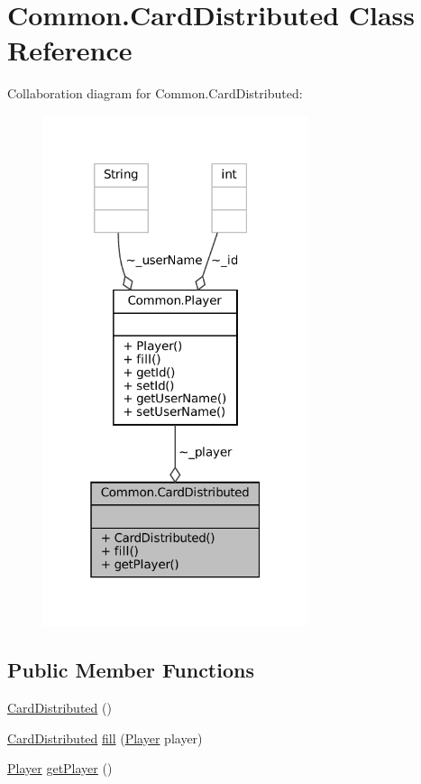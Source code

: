 \hypertarget{classCommon_1_1CardDistributed}{}\section{Common.\+Card\+Distributed Class Reference}
\label{classCommon_1_1CardDistributed}


Collaboration diagram for Common.\+Card\+Distributed\+:
\nopagebreak
\begin{figure}[H]
\begin{center}
\leavevmode
\includegraphics[width=220pt]{classCommon_1_1CardDistributed__coll__graph}
\end{center}
\end{figure}
\subsection*{Public Member Functions}
\begin{DoxyCompactItemize}
\item 
\mbox{\hyperlink{classCommon_1_1CardDistributed_a9e26a96371b98282d4428db7d020b1be}{Card\+Distributed}} ()
\item 
\mbox{\hyperlink{classCommon_1_1CardDistributed}{Card\+Distributed}} \mbox{\hyperlink{classCommon_1_1CardDistributed_af60eec7a32c061fc4bb88a8a48b78d96}{fill}} (\mbox{\hyperlink{classCommon_1_1Player}{Player}} player)
\item 
\mbox{\hyperlink{classCommon_1_1Player}{Player}} \mbox{\hyperlink{classCommon_1_1CardDistributed_a8640cb70a1303199c816d9271b5a1f7d}{get\+Player}} ()
\end{DoxyCompactItemize}


